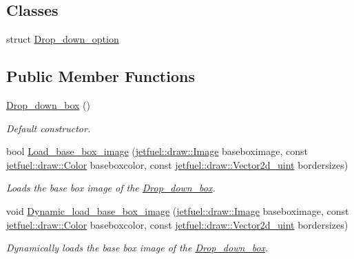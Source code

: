 \subsection*{Classes}
\begin{DoxyCompactItemize}
\item 
struct \hyperlink{structjetfuel_1_1gui_1_1Drop__down__box_1_1Drop__down__option}{Drop\+\_\+down\+\_\+option}
\end{DoxyCompactItemize}
\subsection*{Public Member Functions}
\begin{DoxyCompactItemize}
\item 
\hyperlink{classjetfuel_1_1gui_1_1Drop__down__box_af518d68503aa67f76e70fd4e2d9c3cb3}{Drop\+\_\+down\+\_\+box} ()
\begin{DoxyCompactList}\small\item\em Default constructor. \end{DoxyCompactList}\item 
bool \hyperlink{classjetfuel_1_1gui_1_1Drop__down__box_a9624ef3b9af6d1e3e6fcebb7ef7aa17c}{Load\+\_\+base\+\_\+box\+\_\+image} (\hyperlink{classjetfuel_1_1draw_1_1Image}{jetfuel\+::draw\+::\+Image} baseboximage, const \hyperlink{classjetfuel_1_1draw_1_1Color}{jetfuel\+::draw\+::\+Color} baseboxcolor, const \hyperlink{classjetfuel_1_1draw_1_1Vector2d}{jetfuel\+::draw\+::\+Vector2d\+\_\+uint} bordersizes)
\begin{DoxyCompactList}\small\item\em Loads the base box image of the \hyperlink{classjetfuel_1_1gui_1_1Drop__down__box}{Drop\+\_\+down\+\_\+box}. \end{DoxyCompactList}\item 
void \hyperlink{classjetfuel_1_1gui_1_1Drop__down__box_a64b807d21f55a85ab9600cfd6369d7dc}{Dynamic\+\_\+load\+\_\+base\+\_\+box\+\_\+image} (\hyperlink{classjetfuel_1_1draw_1_1Image}{jetfuel\+::draw\+::\+Image} baseboximage, const \hyperlink{classjetfuel_1_1draw_1_1Color}{jetfuel\+::draw\+::\+Color} baseboxcolor, const \hyperlink{classjetfuel_1_1draw_1_1Vector2d}{jetfuel\+::draw\+::\+Vector2d\+\_\+uint} bordersizes)
\begin{DoxyCompactList}\small\item\em Dynamically loads the base box image of the \hyperlink{classjetfuel_1_1gui_1_1Drop__down__box}{Drop\+\_\+down\+\_\+box}. \end{DoxyCompactList}\item 

\end{DoxyCompactItemize}
